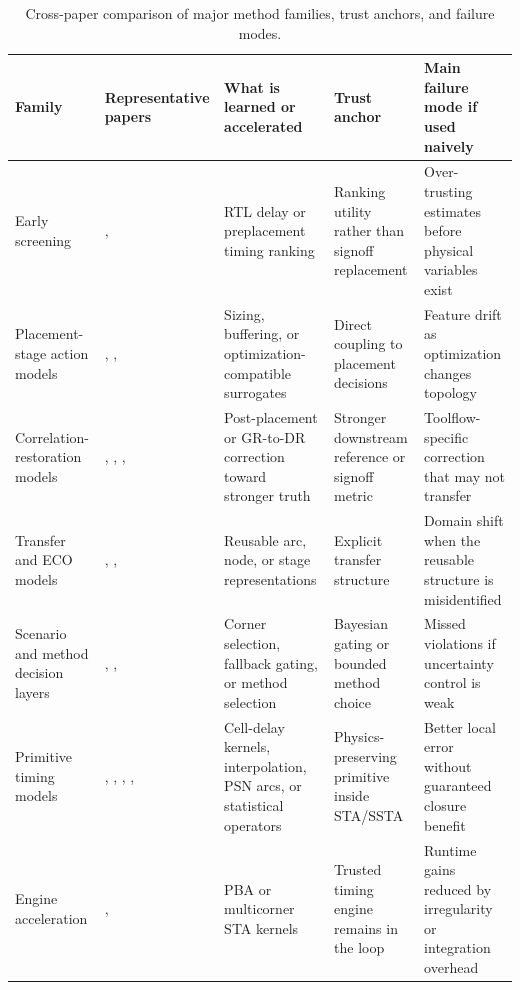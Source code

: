 \documentclass[num-refs]{wiley-article}
\begin{document}
  \begin{table}[tbp]
  \centering
  \caption{Cross-paper comparison of major method families, trust anchors, and failure modes.}
  \label{tab:wiley-3}
  \small
  \begin{tabularx}{\textwidth}{>{\raggedright\arraybackslash}X >{\raggedright\arraybackslash}X >{\raggedright\arraybackslash}X >{\raggedright\arraybackslash}X >{\raggedright\arraybackslash}X}
  \toprule
  \textbf{Family} & \textbf{Representative papers} & \textbf{What is learned or accelerated} & \textbf{Trust anchor} & \textbf{Main failure mode if used naively} \\
  \midrule
  Early screening & \cite{ref27}, \cite{ref29} & RTL delay or preplacement timing ranking & Ranking utility rather than signoff replacement & Over-trusting estimates before physical variables exist \\
  Placement-stage action models & \cite{ref1}, \cite{ref2}, \cite{ref3} & Sizing, buffering, or optimization-compatible surrogates & Direct coupling to placement decisions & Feature drift as optimization changes topology \\
  Correlation-restoration models & \cite{ref25}, \cite{ref13}, \cite{ref10}, \cite{ref7} & Post-placement or GR-to-DR correction toward stronger truth & Stronger downstream reference or signoff metric & Toolflow-specific correction that may not transfer \\
  Transfer and ECO models & \cite{ref4}, \cite{ref6}, \cite{ref19} & Reusable arc, node, or stage representations & Explicit transfer structure & Domain shift when the reusable structure is misidentified \\
  Scenario and method decision layers & \cite{ref16}, \cite{ref28}, \cite{ref9} & Corner selection, fallback gating, or method selection & Bayesian gating or bounded method choice & Missed violations if uncertainty control is weak \\
  Primitive timing models & \cite{ref24}, \cite{ref11}, \cite{ref12}, \cite{ref30}, \cite{ref34} & Cell-delay kernels, interpolation, PSN arcs, or statistical operators & Physics-preserving primitive inside STA/SSTA & Better local error without guaranteed closure benefit \\
  Engine acceleration & \cite{ref21}, \cite{ref22} & PBA or multicorner STA kernels & Trusted timing engine remains in the loop & Runtime gains reduced by irregularity or integration overhead \\
  \bottomrule
  \end{tabularx}
  \end{table}
\end{document}
